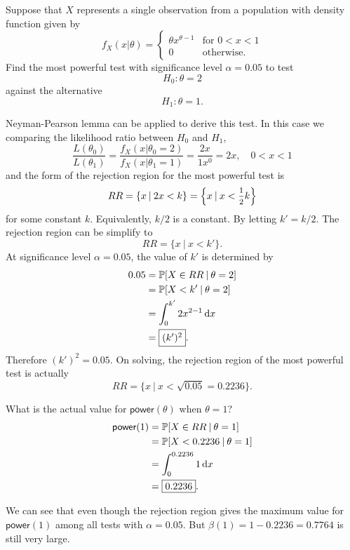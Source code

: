 \begin{example}
    Suppose that $X$ represents a single observation from a population with density function
    given by
    \[
        f_X(x|\theta) = \begin{cases}
            \theta x^{\theta - 1} & \text{for } 0< x < 1\\
            0 & \text{otherwise}.
        \end{cases}
    \]
    Find the most powerful test with significance level $\alpha = 0.05$ to test
    \[
        H_0 : \theta = 2
    \]
    against the alternative
    \[
        H_1 : \theta = 1.
    \]
\end{example}
\begin{solution}
    Neyman-Pearson lemma can be applied to derive this test. In this case we comparing the 
    likelihood ratio between $H_0$ and $H_1$,
    \[
        \frac{L(\theta_0)}{L(\theta_1)} = \frac{f_X(x|\theta_0 = 2)}{f_X(x|\theta_1 = 1)}
        = \frac{2x}{1x^0} = 2x, \quad 0 < x < 1
    \]
    and the form of the rejection region for the most powerful test is 
    \[
        RR = \{ x \> | \> 2x < k \} = \left\{ x \> | \> x < \mfrac{1}{2}k \right\}
    \]
    for some constant $k$. Equivalently, $k/2$ is a constant. By letting 
    $k' = k/2$. The rejection region can be 
    simplify to
    \[
        RR = \{ x \> | \> x < k' \}.
    \]
    At significance level $\alpha = 0.05$, the value of $k'$ is determined by 
    \begin{align*}
        0.05 &= \mathbb{P}[X \in RR \> | \> \theta = 2]\\
        &= \mathbb{P}[X < k' \> | \> \theta = 2]\\
        &= \int_{0}^{k'} 2x^{2-1} \, \mathrm{d}x\\
        &= \fbox{$(k')^2$}.
    \end{align*}
    Therefore $(k')^2 = 0.05$. On solving, the rejection region of the most powerful test is actually
    \[
        RR = \{x \> | \> x < \sqrt{0.05} = 0.2236 \}.
    \]

    What is the actual value for $\textsf{power}(\theta)$ when $\theta = 1$?
    \begin{align*}
        \textsf{power}(1) &= \mathbb{P}[X \in RR \> | \> \theta = 1]\\
        &= \mathbb{P}[X < 0.2236 \> | \> \theta = 1]\\
        &= \int_{0}^{0.2236} 1 \, \mathrm{d}x\\
        &= \fbox{$0.2236$}.
    \end{align*}

    We can see that even though the rejection region gives the maximum value for $\textsf{power}(1)$ 
    among all tests with $\alpha = 0.05$. But $\beta(1) = 1 - 0.2236 = 0.7764$ is still very large.
\end{solution}

